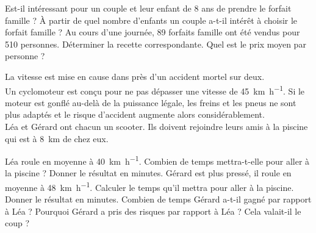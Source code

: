 \documentclass[../Cours.tex]{subfiles}
\begin{document}
\begin{questions}
\question
    \subquestion Est-il intéressant pour un couple et leur enfant de 8 ans de prendre le forfait famille ?
    \subquestion À partir de quel nombre d'enfants un couple a-t-il intérêt à choisir le forfait famille ?
\question Au cours d'une journée, 89 forfaits famille ont été vendus pour 510 personnes.
    \subquestion Déterminer la recette correspondante.
    \subquestion Quel est le prix moyen par personne ?

\exercice

La vitesse est mise en cause dans près d’un accident mortel sur deux.\\
Un cyclomoteur est conçu pour ne pas dépasser une vitesse de \qty{45}{\kilo\metre\per\hour}. Si le moteur est gonflé au-delà de la puissance légale, les freins et les pneus ne sont plus adaptés et le risque d’accident augmente alors considérablement.\\

Léa et Gérard ont chacun un scooter. Ils doivent rejoindre leurs amis à la piscine qui est à \qty{8}{\kilo\metre} de chez eux.

\question Léa roule en moyenne à \qty{40}{\kilo\metre\per\hour}. Combien de temps mettra-t-elle pour aller à la piscine ? Donner le résultat en minutes.
\question Gérard est plus pressé, il roule en moyenne à \qty{48}{\kilo\metre\per\hour}. Calculer le temps qu'il mettra pour aller à la piscine. Donner le résultat en minutes.
\question Combien de temps Gérard a-t-il gagné par rapport à Léa ? 
\question Pourquoi Gérard a pris des risques par rapport à Léa ? Cela valait-il le coup ?

\end{questions}
\end{document}
